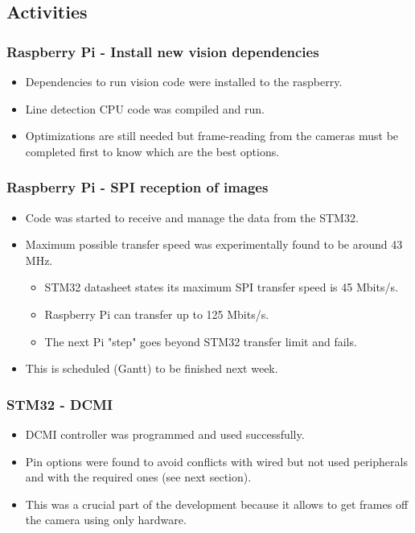\subsection{Activities}


\subsubsection{Raspberry Pi - Install new vision dependencies}
\begin{itemize}
	\item Dependencies to run vision code were installed to the raspberry.
	\item Line detection CPU code was compiled and run.
	\item Optimizations are still needed but frame-reading from the cameras must be completed first to know which are the best options.
\end{itemize}


\subsubsection{Raspberry Pi - SPI reception of images}
\begin{itemize}
	\item Code was started to receive and manage the data from the STM32.
	\item Maximum possible transfer speed was experimentally found to be around 43 MHz.
	\begin{itemize}
		\item STM32 datasheet states its maximum SPI transfer speed is 45 Mbits/s.
		\item Raspberry Pi can transfer up to 125 Mbits/s.
		\item The next Pi "step" goes beyond STM32 transfer limit and fails.
	\end{itemize}
	\item This is scheduled (Gantt) to be finished next week.
\end{itemize}


\subsubsection{STM32 - DCMI}
\begin{itemize}
	\item DCMI controller was programmed and used successfully.
	\item Pin options were found to avoid conflicts with wired but not used peripherals and with the required ones (see next section).
	\item This was a crucial part of the development because it allows to get frames off the camera using only hardware.
\end{itemize}

